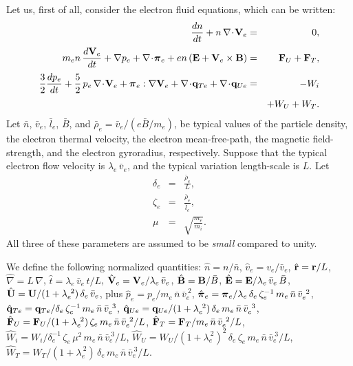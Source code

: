Let us, first of all, consider the electron fluid equations, which can
be written:
\begin{eqnarray}
\frac{dn}{dt} + n\,\nabla\!\cdot\!{\bf V}_e &=& 0,\\[0.5ex]
m_e n\,\frac{d {\bf V}_e}{dt} + \nabla p_e+ \nabla\!\cdot \!\bpi_e + e n\,
({\bf E} + {\bf V}_e\times {\bf B})& =& {\bf F}_U +{\bf F}_T,\\[0.5ex]
\frac{3}{2}\frac{d p_e}{dt} + \frac{5}{2}\,p_e\,\nabla\!\cdot\!{\bf V}_e
+ \bpi_e:\nabla{\bf V}_e+ \nabla\!\cdot\!{\bf q}_{Te} 
+ \nabla\!\cdot\!{\bf q}_{Ue} &=& -W_i\\[0.5ex]
&&+W_U + W_T.\nonumber
\end{eqnarray}
Let $\bar{n}$, $\bar{v}_e$, $\bar{l}_e$, $\bar{B}$,
and $\bar{\rho}_e =\bar{ v}_e/(e\bar{B}/m_e)$,  be typical values
of the particle density, the electron thermal velocity, the electron
mean-free-path,  the magnetic field-strength, and the
electron gyroradius,  respectively. 
Suppose that the typical electron flow velocity is $\lambda_e\,\bar{v}_e$, and
the typical variation length-scale is $L$. Let
 \begin{eqnarray}
\delta_e &=& \frac{\bar{\rho}_e}{L},\\[0.5ex]
\zeta_e &=& \frac{\bar{\rho}_e}{\bar{l}_e},\\[0.5ex]
\mu &=& \sqrt{\frac{m_e}{m_i}}.
\end{eqnarray}
All three of these parameters are assumed to be {\em small}\/
compared to unity.

 We
define the following normalized quantities: $\hat{n} = n/\bar{n}$,
$\hat{v}_e = v_e/\bar{v}_e$, $\hat{\bf r} = {\bf r}/ L$, 
$\hat{\nabla} = L\,\nabla$, $\hat{t} = \lambda_e\,\bar{v}_e\,t/L$, 
$\hat{\bf V}_e = {\bf V}_e/\lambda_e\,\bar{v}_e$, $\hat{\bf B}= {\bf B}
/\bar{B}$, $\hat{\bf E} = {\bf E}/ \lambda_e\,\bar{v}_e\,\bar{B}$,
$\hat{\bf U} ={\bf U} / (1+\lambda_e^{~2})\,\delta_e\,\bar{v}_e$, 
plus 
$\hat{p}_e = p_e/m_e\,\bar{n}\,\bar{v}_e^{~2}$, $\hat{\mbox{\boldmath$\pi$}}_e= \mbox{\boldmath$\pi$}_e
/\lambda_e\,\delta_e\,\zeta_e^{-1}\,m_e\,\bar{n}\,\bar{v}_e^{~2}$, 
$\hat{\bf q}_{Te} = {\bf q}_{Te} / \delta_e\,\zeta_e^{-1}\,
m_e\,\bar{n}\,\bar{v}_e^{~3}$, $\hat{\bf q}_{Ue} = {\bf q}_{Ue} / 
(1+\lambda_e^{~2})\,\delta_e\,m_e\,\bar{n}\,\bar{v}_e^{~3}$, 
$\hat{\bf F}_U = {\bf F}_U/ (1+\lambda_e^{~2}) \,\zeta_e\,
m_e\,\bar{n}\,\bar{v}_e^{~2}/L$, 
$\hat{\bf F}_T = {\bf F}_T/m_e\,\bar{n}\,\bar{v}_e^{~2}/L$,
$\hat{W}_i = W_i/\delta_e^{-1}\,\zeta_e\,\mu^2\, m_e\,\bar{n}\,\bar{v}_e^{~3}/L$,
$\hat{W}_U = W_U/(1+\lambda_e^{~2})^2\,\delta_e\,\zeta_e\, m_e\,
\bar{n}\,\bar{v}_e^{~3}/L$,
$\hat{W}_T = W_T/(1+\lambda_e^{~2})\,\delta_e\, m_e\,\bar{n}\,\bar{v}_e^{~3}/L$.

